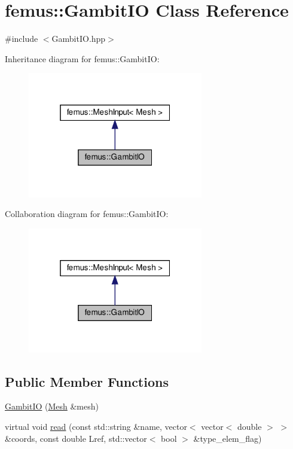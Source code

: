 \hypertarget{classfemus_1_1_gambit_i_o}{}\section{femus\+:\+:Gambit\+IO Class Reference}
\label{classfemus_1_1_gambit_i_o}


{\ttfamily \#include $<$Gambit\+I\+O.\+hpp$>$}



Inheritance diagram for femus\+:\+:Gambit\+IO\+:
\nopagebreak
\begin{figure}[H]
\begin{center}
\leavevmode
\includegraphics[width=217pt]{classfemus_1_1_gambit_i_o__inherit__graph}
\end{center}
\end{figure}


Collaboration diagram for femus\+:\+:Gambit\+IO\+:
\nopagebreak
\begin{figure}[H]
\begin{center}
\leavevmode
\includegraphics[width=217pt]{classfemus_1_1_gambit_i_o__coll__graph}
\end{center}
\end{figure}
\subsection*{Public Member Functions}
\begin{DoxyCompactItemize}
\item 
\mbox{\hyperlink{classfemus_1_1_gambit_i_o_adc85d54e3d9628db1fed594103f43c7a}{Gambit\+IO}} (\mbox{\hyperlink{classfemus_1_1_mesh}{Mesh}} \&mesh)
\item 
virtual void \mbox{\hyperlink{classfemus_1_1_gambit_i_o_a5457692b7562f09d2d14e9b16cfd4488}{read}} (const std\+::string \&name, vector$<$ vector$<$ double $>$ $>$ \&coords, const double Lref, std\+::vector$<$ bool $>$ \&type\+\_\+elem\+\_\+flag)
\end{DoxyCompactItemize}
